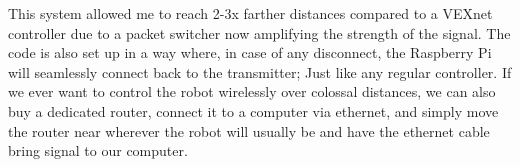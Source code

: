 This system allowed me to reach 2-3x farther distances compared to a VEXnet controller due to a packet switcher now amplifying the strength of the signal. The code is also set up in a way where, in case of any disconnect, the Raspberry Pi will seamlessly connect back to the transmitter; Just like any regular controller. If we ever want to control the robot wirelessly over colossal distances, we can also buy a dedicated router, connect it to a computer via ethernet, and simply move the router near wherever the robot will usually be and have the ethernet cable bring signal to our computer.
